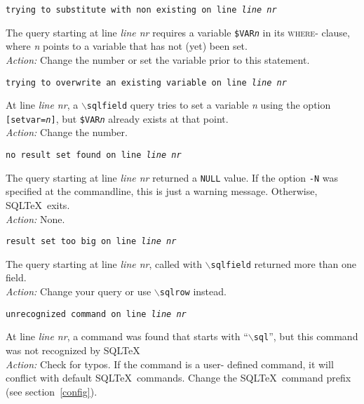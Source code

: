 \documentclass{article}
\newcommand{\bs}{\begin{math}\backslash\end{math}}
\newcommand{\vs}{\vspace{3mm}}
\begin{document}
\vs

\noindent\texttt{trying to substitute with non existing on line \textit{line nr}}

\vspace{1mm}

\noindent The query starting at line \textit{line nr} requires a variable \texttt{\$VAR\textit{n}} in its
\textsc{where}- clause, where \textit{n} points to a variable that has not (yet) been set. \\
\textit{Action:} Change the number or set the variable prior to this statement.

\vs

\noindent\texttt{trying to overwrite an existing variable on line \textit{line nr}}

\vspace{1mm}

\noindent At line \textit{line nr}, a \texttt{\bs sqlfield} query tries to set a variable \textit{n}
using the option \texttt{[setvar=\textit{n}]}, but \texttt{\$VAR\textit{n}} already
exists at that point. \\
\textit{Action:} Change the number.

\vs

\noindent\texttt{no result set found on line \textit{line nr}}

\vspace{1mm}

\noindent The query starting at line \textit{line nr} returned a \texttt{NULL} value. If the
option \texttt{-N} was specified at the commandline, this is just a warning message.
Otherwise, SQL\TeX\ exits. \\
\textit{Action:} None.

\vs

\noindent\texttt{result set too big on line \textit{line nr}}

\vspace{1mm}

\noindent The query starting at line \textit{line nr}, called with \texttt{\bs sqlfield} returned more than one field. \\
\textit{Action:} Change your query or use \texttt{\bs sqlrow} instead.

\vs

\noindent\texttt{unrecognized command on line \textit{line nr}}

\vspace{1mm}

\noindent At line \textit{line nr}, a command was found that starts with ``\texttt{\bs sql}'',
but this command was not recognized by SQL\TeX\. \\
\textit{Action:} Check for typos. If the command is a user- defined command, it will
conflict with default SQL\TeX\ commands. Change the SQL\TeX\ command prefix (see section~\ref{config}).
\end{document}
